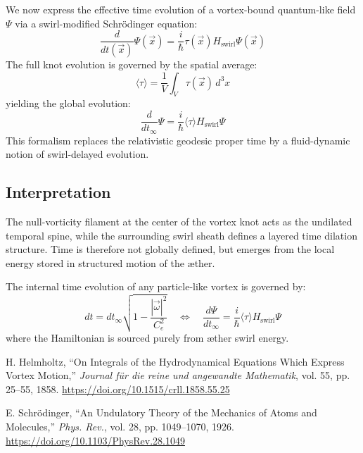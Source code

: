 \documentclass[12pt]{article}
\begin{document}
    We now express the effective time evolution of a vortex-bound quantum-like field \( \Psi \) via a swirl-modified Schrödinger equation:
    \begin{equation}
        \frac{d}{dt(\vec{x})} \Psi(\vec{x}) = \frac{i}{\hbar} \tau(\vec{x}) H_{\text{swirl}} \Psi(\vec{x})
    \end{equation}
    The full knot evolution is governed by the spatial average:
    \begin{equation}
        \langle \tau \rangle = \frac{1}{V} \int_V \tau(\vec{x}) \, d^3x
    \end{equation}
    yielding the global evolution:
    \begin{equation}
        \frac{d}{dt_\infty} \Psi = \frac{i}{\hbar} \langle \tau \rangle H_{\text{swirl}} \Psi
    \end{equation}
    This formalism replaces the relativistic geodesic proper time by a fluid-dynamic notion of swirl-delayed evolution.

    \subsection{Interpretation}

    The null-vorticity filament at the center of the vortex knot acts as the undilated temporal spine, while the surrounding swirl sheath defines a layered time dilation structure. Time is therefore not globally defined, but emerges from the local energy stored in structured motion of the æther.

    \begin{tcolorbox}[colback=gray!8, colframe=black!30, title=Swirl-Time Coupling in VAM]
        The internal time evolution of any particle-like vortex is governed by:
        \[
            dt = dt_\infty \sqrt{1 - \frac{|\vec{\omega}|^2}{C_e^2}} \quad \Longleftrightarrow \quad
            \frac{d\Psi}{dt_\infty} = \frac{i}{\hbar} \langle \tau \rangle H_{\text{swirl}} \Psi
        \]
        where the Hamiltonian is sourced purely from æther swirl energy.
    \end{tcolorbox}

    
    \begin{thebibliography}{99}
        H. Helmholtz, ``On Integrals of the Hydrodynamical Equations Which Express Vortex Motion,'' \textit{Journal für die reine und angewandte Mathematik}, vol. 55, pp. 25–55, 1858. \url{https://doi.org/10.1515/crll.1858.55.25}

        E. Schrödinger, ``An Undulatory Theory of the Mechanics of Atoms and Molecules,'' \textit{Phys. Rev.}, vol. 28, pp. 1049–1070, 1926. \url{https://doi.org/10.1103/PhysRev.28.1049}
    \end{thebibliography}
\end{document}
